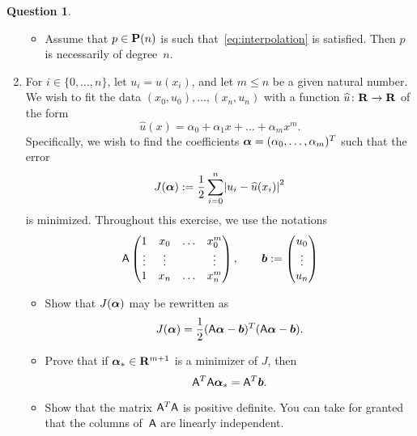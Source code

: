 \documentclass[11pt]{article}
\theoremstyle{definition}
\newtheorem{question}{Question}
\begin{document}
\begin{question}
\begin{enumerate}
\begin{itemize}
                \item
                    Assume that $p \in \mathbf P(n)$ is such that~\eqref{eq:interpolation} is satisfied.
                    Then $p$ is necessarily of degree~$n$.
            \end{itemize}
    \item
        For $i \in \{0, \dotsc, n\}$, 
        let $u_i = u(x_i)$,
        and let $m \leq n$ be a given natural number.
        We wish to fit the data $(x_0, u_0), \dotsc, (x_n, u_n)$ with a function $\widehat u\colon \mathbf R \to \mathbf R$ of the form
        \[
            \widehat u(x) = \alpha_0 + \alpha_1 x + \dotsc + \alpha_m x^m.
        \]
        Specifically, we wish to find the coefficients $\mathbf{\boldsymbol{\alpha}} = (\alpha_0, \dotsc, \alpha_m)^T$
        such that the error
        \[
            J(\vect \alpha) := \frac{1}{2}\sum_{i=0}^{n} \abs[big]{u_i - \widehat u(x_i)}^2
        \]
        is minimized.
        Throughout this exercise,
        we use the notations
        \[
            \mathsf A
            \begin{pmatrix}
                1 & x_0 & \hdots & x_0^m \\
                \vdots & \vdots & & \vdots \\
                1 & x_{n} & \hdots & x_n^m
            \end{pmatrix},
            \qquad
            \mathbf{\boldsymbol{b}} :=
            \begin{pmatrix}
                u_0 \\
                \vdots \\
                u_n
            \end{pmatrix}
        \]
        \begin{itemize}
            \item
                Show that $J(\mathbf{\boldsymbol{\alpha}})$ may be rewritten as
                \[
                    J(\mathbf{\boldsymbol{\alpha}}) = \frac{1}{2} (\mathsf A \mathbf{\boldsymbol{\alpha}}  - \mathbf{\boldsymbol{b}})^T (\mathsf A \mathbf{\boldsymbol{\alpha}}  - \mathbf{\boldsymbol{b}}).
                \]

            \item
                Prove that if $\mathbf{\boldsymbol{\alpha}}_* \in \mathbf R^{m+1}$ is a minimizer of $J$,
                then
                \[
                    \mathsf A^T \mathsf A \mathbf{\boldsymbol{\alpha}}_* = \mathsf A^T \mathbf{\boldsymbol{b}}.
                \]

            \item
                \mark
                Show that the matrix $\mathsf A^T \mathsf A$ is positive definite.
                You can take for granted that the columns of~$\mathsf A$ are linearly independent.
        \end{itemize}
\end{enumerate}

\end{question}
\end{document}
